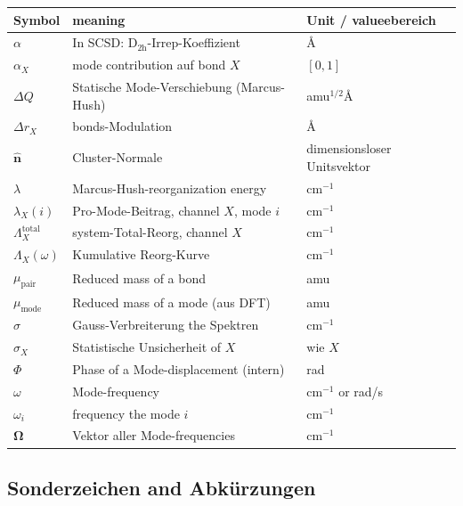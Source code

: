 \documentclass[11pt,a4paper,twoside]{article}
\providecommand{\angstrom}{\text{\AA}}    %
\theoremstyle{remark}
\begin{document}
\begin{tabular}{p{1.5cm} p{6cm} p{4cm}}
  \toprule
  \textbf{Symbol} & \textbf{meaning} & \textbf{Unit / valueebereich} \\
  \midrule
  $\alpha$        & In SCSD: D$_\text{2h}$-Irrep-Koeffizient & $\angstrom$ \\
  $\alpha_X$      & mode contribution auf bond $X$ & $[0, 1]$ \\
  $\Delta Q$      & Statische Mode-Verschiebung (Marcus-Hush) & amu$^{1/2}\angstrom$ \\
  $\Delta r_X$    & bonds-Modulation & $\angstrom$ \\
  $\hat{\mathbf{n}}$ & Cluster-Normale & dimensionsloser Unitsvektor \\
  $\lambda$       & Marcus-Hush-reorganization energy & cm$^{-1}$ \\
  $\lambda_X(i)$  & Pro-Mode-Beitrag, channel $X$, mode $i$ & cm$^{-1}$ \\
  $\Lambda_X^\text{total}$ & system-Total-Reorg, channel $X$ & cm$^{-1}$ \\
  $\Lambda_X(\omega)$ & Kumulative Reorg-Kurve & cm$^{-1}$ \\
  $\mu_\text{pair}$ & Reduced mass of a bond & amu \\
  $\mu_\text{mode}$ & Reduced mass of a mode (aus DFT) & amu \\
  $\sigma$        & Gauss-Verbreiterung the Spektren & cm$^{-1}$ \\
  $\sigma_X$      & Statistische Unsicherheit of $X$ & wie $X$ \\
  $\Phi$          & Phase of a Mode-displacement (intern) & rad \\
  $\omega$        & Mode-frequency & cm$^{-1}$ or rad/s \\
  $\omega_i$      & frequency the mode $i$ & cm$^{-1}$ \\
  $\mathbf{\Omega}$ & Vektor aller Mode-frequencies & cm$^{-1}$ \\
  \bottomrule
\end{tabular}

\subsection{Sonderzeichen and Abk\"urzungen}
\end{document}
